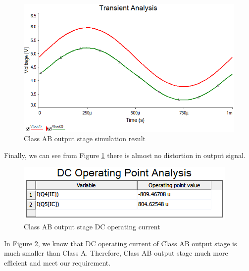 \begin{figure}[htbp]
\centering
\includegraphics[scale=0.7 ]{"../Photo/Chap4/Class AB output stage simlation result"}
\caption{Class AB output stage simulation result}
\label{fig:ClassABoutputstagesimlationresult}
\end{figure}

Finally, we can see from Figure \ref{fig:ClassABoutputstagesimlationresult} there is almost no distortion in output signal.

\begin{figure}[htbp]
\centering
\includegraphics[scale=1 ]{"../Photo/Chap4/Class AB output stage DC operatingh current data"}
\caption{Class AB output stage DC operating current}
\label{fig:ClassABoutputstageDCoperatinghcurrentdata}
\end{figure}

In Figure \ref{fig:ClassABoutputstageDCoperatinghcurrentdata}, we know that DC operating current of Class AB output stage is much smaller than Class A. Therefore, Class AB output stage much more efficient and meet our requirement.
